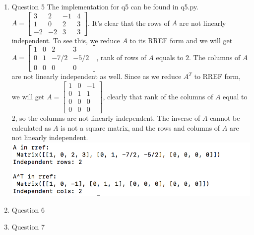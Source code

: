 \documentclass[11pt]{article}
\begin{document}
\begin{enumerate}
\item Question 5\newline
The implementation for q5 can be found in q5.py. $A = \begin{bmatrix} 3 & 2 & -1 & 4 \\ 1 & 0 & 2 & 3 \\ -2 & -2 & 3 & 3\end{bmatrix}$. It's clear that the rows of $A$ are not linearly independent. To see this, we reduce $A$ to its RREF form and we will get $A = \begin{bmatrix} 1 & 0 & 2 & 3 \\ 0 & 1 & -7/2 & -5/2 \\ 0 & 0 & 0 & 0\end{bmatrix}$, rank of rows of $A$ equals to $2$. The columns of $A$ are not linearly independent as well. Since as we reduce $A^T$ to RREF form, we will get $A = \begin{bmatrix} 1 &0 & -1 \\ 0 & 1 & 1 \\ 0 & 0 & 0 \\ 0 & 0 & 0\end{bmatrix}$, clearly that rank of the columns of $A$ equal to $2$, so the columns are not linearly independent. The inverse of $A$ cannot be calculated as $A$ is not a square matrix, and the rows and columns of $A$ are not linearly independent.\\
\includegraphics{q5_result}

\item Question 6\newline

\item Question 7\newline

\end{enumerate}
\end{document}
